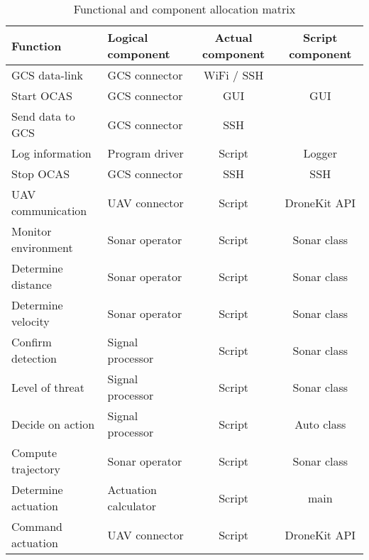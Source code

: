 \begin{table}[htbp]
	\centering
	\begin{tabular}{llcc}

		\hline
		Function		&	Logical component	&	Actual component	&	Script component	\\
		\hline
		GCS data-link	&	GCS connector		&	WiFi / SSH			&	\\
		Start OCAS		&	GCS connector		&	GUI					&	GUI	\\
		Send data to GCS&	GCS connector		&	SSH					&	\\
		Log information	&	Program driver		&	Script				&	Logger	\\
		Stop OCAS		&	GCS connector		&	SSH					&	SSH	\\
		UAV communication&	UAV connector		&	Script				&	DroneKit API \\
		Monitor environment&Sonar operator		&	Script				&	Sonar class	\\
		Determine distance&	Sonar operator		&	Script				&	Sonar class	\\
		Determine velocity&	Sonar operator		&	Script				&	Sonar class	\\
		Confirm detection&	Signal processor	&	Script				&	Sonar class	\\
		Level of threat	&	Signal processor	&	Script				&	Sonar class	\\
		Decide on action&	Signal processor	&	Script				&	Auto class	\\
		Compute trajectory&	Sonar operator		&	Script				&	Sonar class	\\
		Determine actuation&Actuation calculator&	Script				&	main	\\
		Command actuation&	UAV connector		&	Script				&	DroneKit API \\
		\hline

	\end{tabular}
	\caption{Functional and component allocation matrix}
	\label{tab:allocation}
\end{table}
